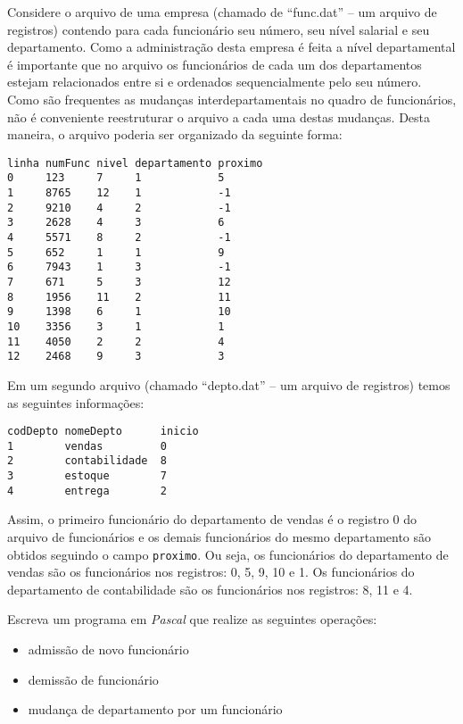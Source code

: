 \item Considere o arquivo de uma empresa (chamado de ``func.dat'' -- um arquivo
de registros) contendo
para cada funcionário seu número, seu nível salarial e seu departamento.
Como a administração desta empresa é feita a nível departamental é
importante que no arquivo os funcionários de cada um dos departamentos
estejam relacionados entre si e ordenados sequencialmente pelo seu número.
Como são frequentes as mudanças interdepartamentais no quadro de
funcionários, não é conveniente reestruturar o arquivo a cada uma destas
mudanças.  Desta maneira, o arquivo poderia ser organizado da seguinte
forma:

\begin{verbatim}
linha numFunc nivel departamento proximo
0     123     7     1            5
1     8765    12    1            -1
2     9210    4     2            -1
3     2628    4     3            6
4     5571    8     2            -1
5     652     1     1            9
6     7943    1     3            -1
7     671     5     3            12
8     1956    11    2            11
9     1398    6     1            10
10    3356    3     1            1
11    4050    2     2            4
12    2468    9     3            3
\end{verbatim}




Em um segundo arquivo (chamado ``depto.dat'' -- um arquivo de registros)
temos as seguintes informações:

\begin{verbatim}
codDepto nomeDepto      inicio
1        vendas         0
2        contabilidade  8
3        estoque        7
4        entrega        2
\end{verbatim}

Assim, o primeiro funcionário do departamento de vendas é o registro 0 do
arquivo de funcionários e os demais funcionários do mesmo departamento são
obtidos seguindo o campo {\tt proximo}.  Ou seja, os funcionários do
departamento de vendas são os funcionários nos registros: 0, 5, 9, 10 e 1.
Os funcionários do departamento de contabilidade são os funcionários nos
registros: 8, 11 e 4.

Escreva um programa em \emph{Pascal} que realize as seguintes operações:
\begin{itemize}
\item admissão de novo funcionário
\item demissão de funcionário
\item mudança de departamento por um funcionário
\end{itemize} 

